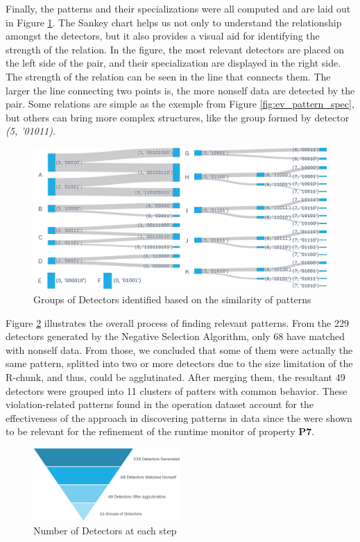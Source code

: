 Finally, the patterns and their specializations were all computed and are laid out in Figure \ref{fig:ev_sankey}. The Sankey chart helps us not only to understand the relationship amongst the detectors, but it also provides a visual aid for identifying the strength of the relation. In the figure, the most relevant detectors are placed on the left side of the pair, and their specialization are displayed in the right side. The strength of the relation can be seen in the line that connects them. The larger the line connecting two points is, the more nonself data are detected by the pair. Some relations are simple as the exemple from Figure \ref{fig:ev_pattern_spec}, but others can bring more complex structures, like the group formed by detector \textit{(5, '01011)}.

\begin{figure}[]
	\centering
	\includegraphics[width=\textwidth, keepaspectratio]{img/sankey3.png}
	\caption{Groups of Detectors identified based on the similarity of patterns}
	\label{fig:ev_sankey}
\end{figure}

Figure \ref{fig:pyramid} illustrates the overall process of finding relevant patterns. From the 229 detectors generated by the Negative Selection Algorithm, only 68 have matched with nonself data. From those, we concluded that some of them were actually the same pattern, splitted into two or more detectors due to the size limitation of the R-chunk, and thus, could be agglutinated. After merging them, the resultant 49 detectors were grouped into 11 clusters of patters with common behavior. These violation-related patterns found in the operation dataset account for the effectiveness of the approach in discovering patterns in data since the were shown to be relevant for the refinement of the runtime monitor of property \textbf{P7}.

\begin{figure}[!h]
	\centering
	\includegraphics[width=0.5\textwidth, keepaspectratio]{img/detector_piramid.png}
	\caption{Number of Detectors at each step}
	\label{fig:pyramid}
\end{figure}


